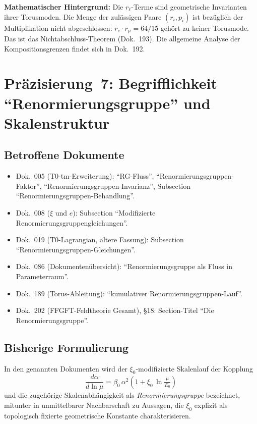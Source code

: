\textbf{Mathematischer Hintergrund:} Die $r_\ell$-Terme sind
geometrische Invarianten ihrer Torusmoden. Die Menge der zulässigen
Paare $(r_i, p_i)$ ist bezüglich der Multiplikation nicht abgeschlossen:
$r_e \cdot r_\mu = 64/15$ gehört zu keiner Torusmode.
Das ist das Nichtabschluss-Theorem (Dok.~193).
Die allgemeine Analyse der Kompositionsgrenzen findet sich in Dok.~192.

\section{\texorpdfstring{Präzisierung~7: Begrifflichkeit \enquote{Renormierungsgruppe} und Skalenstruktur}{Praezisierung 7: Begrifflichkeit Renormierungsgruppe und Skalenstruktur}}

\subsection*{Betroffene Dokumente}

\begin{itemize}
  \item Dok.~005 (T0-tm-Erweiterung): \enquote{RG-Fluss}, \enquote{Renormierungs\-gruppen-Faktor},
        \enquote{Renormierungs\-gruppen-Invarianz},
        Subsection \enquote{Renormierungs\-gruppen-Behandlung}.
  \item Dok.~008 ($\xi$ und $e$): Subsection \enquote{Modifizierte
        Renormierungs\-gruppen\-gleichungen}.
  \item Dok.~019 (T0-Lagrangian, ältere Fassung):
        Subsection \enquote{Renormierungs\-gruppen-Gleichungen}.
  \item Dok.~086 (Dokumentenübersicht): \enquote{Renormierungsgruppe als Fluss
        in Parameterraum}.
  \item Dok.~189 (Torus-Ableitung): \enquote{kumulativer
        Renormierungs\-gruppen-Lauf}.
  \item Dok.~202 (FFGFT-Feldtheorie Gesamt), \S 18:
        Section-Titel \enquote{Die Renormierungsgruppe}.
\end{itemize}

\subsection*{Bisherige Formulierung}

In den genannten Dokumenten wird der $\xi_0$-modifizierte Skalenlauf
der Kopplung
\begin{equation}
  \frac{d\alpha}{d\ln\mu}
  = \beta_0\,\alpha^2\!\left(1 + \xi_0\,\ln\tfrac{\mu}{E_0}\right)
  \tag{alt -- ungenau}
\end{equation}
und die zugehörige Skalenabhängigkeit als \emph{Renormierungsgruppe}
bezeichnet, mitunter in unmittelbarer Nachbarschaft zu Aussagen, die
$\xi_0$ explizit als topologisch fixierte geometrische Konstante
charakterisieren.

